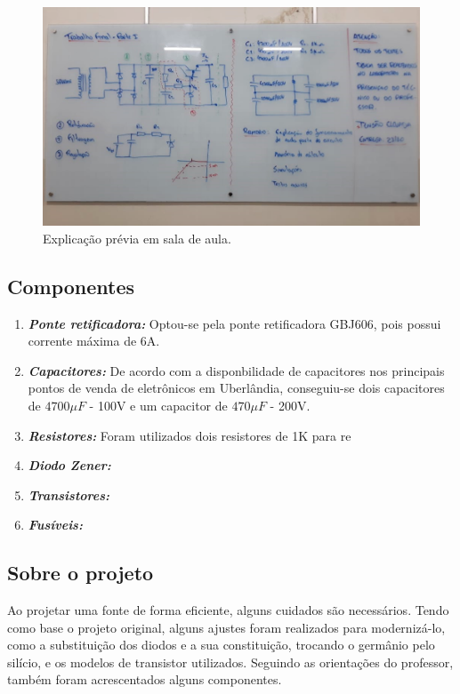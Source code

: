 \documentclass[a4paper,12pt,oneside,openany,table,xcdraw]{article}
\begin{document}
\begin{figure}[H]
\centering
\captionsetup{font=scriptsize}
\includegraphics[width=16cm]{quadro}
\caption{Explicação prévia em sala de aula.}
\label{quadro}
\end{figure}

\subsection{Componentes}
\begin{enumerate}[1 -]
    \item \textbf{\emph{Ponte retificadora:}} Optou-se pela ponte retificadora GBJ606, pois possui corrente máxima de 6A.
    \item \textbf{\emph{Capacitores:}} De acordo com a disponbilidade de capacitores nos principais pontos de venda de eletrônicos em Uberlândia, conseguiu-se dois capacitores de $4700\mu F$ - 100V e um capacitor de $470\mu F$ - 200V.
    \item \textbf{\emph{Resistores:}} Foram utilizados dois resistores de 1K para re
    \item \textbf{\emph{Diodo Zener:}}
    \item \textbf{\emph{Transistores:}}
    \item \textbf{\emph{Fusíveis:}}

    
    
\end{enumerate}

\subsection{Sobre o projeto}
 
   Ao projetar uma fonte  de forma  eficiente, alguns cuidados são necessários. Tendo como base o projeto original, alguns ajustes foram realizados para modernizá-lo, como a substituição dos diodos e a sua constituição, trocando o germânio pelo silício, e os modelos de transistor utilizados. Seguindo as orientações do professor, também foram acrescentados alguns componentes.
   
\end{document}
